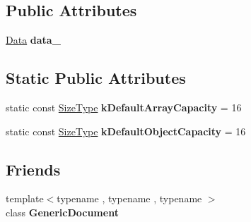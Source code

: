 \subsection*{Public Attributes}
\begin{DoxyCompactItemize}
\item 
\hyperlink{unionGenericValue_1_1Data}{Data} {\bfseries data\+\_\+}\hypertarget{classGenericValue_aaf80f2c91d26fdde60b9edeeecd3509f}{}\label{classGenericValue_aaf80f2c91d26fdde60b9edeeecd3509f}

\end{DoxyCompactItemize}
\subsection*{Static Public Attributes}
\begin{DoxyCompactItemize}
\item 
static const \hyperlink{rapidjson_8h_a5ed6e6e67250fadbd041127e6386dcb5}{Size\+Type} {\bfseries k\+Default\+Array\+Capacity} = 16\hypertarget{classGenericValue_a188f57bdb1923c1fefe74baa995871a3}{}\label{classGenericValue_a188f57bdb1923c1fefe74baa995871a3}

\item 
static const \hyperlink{rapidjson_8h_a5ed6e6e67250fadbd041127e6386dcb5}{Size\+Type} {\bfseries k\+Default\+Object\+Capacity} = 16\hypertarget{classGenericValue_a284d018914629aed9a4bd97fe2dc5899}{}\label{classGenericValue_a284d018914629aed9a4bd97fe2dc5899}

\end{DoxyCompactItemize}
\subsection*{Friends}
\begin{DoxyCompactItemize}
\item 
{\footnotesize template$<$typename , typename , typename $>$ }\\class {\bfseries Generic\+Document}\hypertarget{classGenericValue_ab05bc9e52e201a2867ea5bac141ee1ae}{}\label{classGenericValue_ab05bc9e52e201a2867ea5bac141ee1ae}

\end{DoxyCompactItemize}
